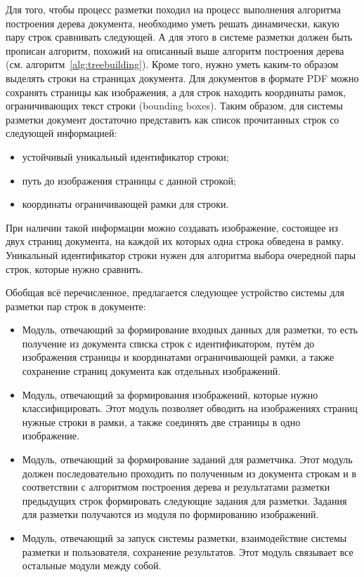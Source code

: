 Для того, чтобы процесс разметки походил на процесс выполнения алгоритма построения дерева документа, необходимо уметь решать динамически, какую пару строк сравнивать следующей.
А для этого в системе разметки должен быть прописан алгоритм, похожий на описанный выше алгоритм построения дерева (см. алгоритм~\ref{alg:treebuilding}).
Кроме того, нужно уметь каким-то образом выделять строки на страницах документа.
Для документов в формате PDF можно сохранять страницы как изображения, а для строк находить координаты рамок, ограничивающих текст строки (bounding boxes).
Таким образом, для системы разметки документ достаточно представить как список прочитанных строк со следующей информацией:
\begin{itemize}
    \item устойчивый уникальный идентификатор строки;
    \item путь до изображения страницы с данной строкой;
    \item координаты ограничивающей рамки для строки.
\end{itemize}
При наличии такой информации можно создавать изображение, состоящее из двух страниц документа, на каждой их которых одна строка обведена в рамку.
Уникальный идентификатор строки нужен для алгоритма выбора очередной пары строк, которые нужно сравнить.

Обобщая всё перечисленное, предлагается следующее устройство системы для разметки пар строк в документе:
\begin{itemize}
    \item Модуль, отвечающий за формирование входных данных для разметки, то есть получение из документа списка строк с
    идентификатором, путём до изображения страницы и координатами ограничивающей рамки, а также сохранение страниц документа как отдельных изображений.
    \item Модуль, отвечающий за формирования изображений, которые нужно классифицировать.
    Этот модуль позволяет обводить на изображениях страниц нужные строки в рамки, а также соединять две страницы в одно изображение.
    \item Модуль, отвечающий за формирование заданий для разметчика.
    Этот модуль должен последовательно проходить по полученным из документа строкам и в соответствии с алгоритмом построения дерева и результатами разметки предыдущих строк формировать следующие задания для разметки.
    Задания для разметки получаются из модуля по формированию изображений.
    \item Модуль, отвечающий за запуск системы разметки, взаимодействие системы разметки и пользователя, сохранение результатов.
    Этот модуль связывает все остальные модули между собой.
\end{itemize}

